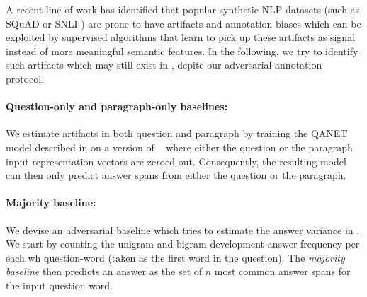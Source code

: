 

A recent line of work \cite{Gururangan:2018,Kaushik2018HowMR} has identified that popular synthetic NLP datasets
(such as SQuAD \cite{Rajpurkar2016SQuAD10} or SNLI \cite{Bowman2015ALA}) are prone to have artifacts and annotation biases which can be exploited by supervised algorithms that
learn to pick up these artifacts as signal instead of more meaningful semantic features.
In the following, we try to identify such artifacts which may still exist in \drop, depite our adversarial annotation protocol.

\paragraph{Question-only and paragraph-only baselines:}
We estimate artifacts in both question and paragraph by training the QANET model described in  on a version of \drop~ where either the question or the 
paragraph input representation vectors are zeroed out.
Consequently, the resulting model can then only predict answer spans from either the question or the paragraph.

\paragraph{Majority baseline:}
We devise an adversarial baseline which tries to 
estimate the answer variance in \drop.
We start by counting the unigram and bigram development answer frequency 
per each  wh question-word (taken as the first word in the question). 
The \emph{majority baseline} then predicts an answer as the set of $n$ most common answer spans for the input question word.
